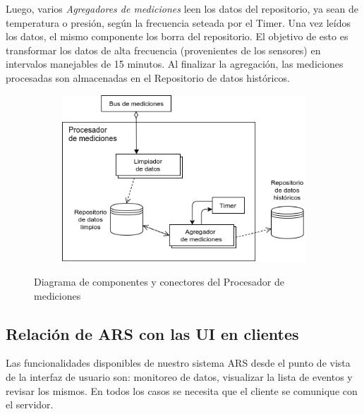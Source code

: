\par Luego, varios \textit{Agregadores de mediciones} leen los datos del repositorio, ya sean de temperatura o presión, según la frecuencia seteada por el Timer. Una vez leídos los datos, el mismo componente los borra del repositorio. El objetivo de esto es transformar los datos de alta frecuencia (provenientes de los sensores) en intervalos manejables de 15 minutos. Al finalizar la agregación, las mediciones procesadas son almacenadas en el Repositorio de datos históricos.

\begin{figure}[H]
  \begin{subfigure}{\textwidth}
    \includegraphics[width=\textwidth]{imagenes/diagramas/procesadorDeMediciones.png}
  \end{subfigure}
  \caption{Diagrama de componentes y conectores del Procesador de mediciones}
  \label{fig:proc_med}
\end{figure}



\subsection{Relación de ARS con las UI en clientes}

\par Las funcionalidades disponibles de nuestro sistema ARS desde el punto de vista de la interfaz de usuario son: monitoreo de datos, visualizar la lista de eventos y revisar los mismos. En todos los casos se necesita que el cliente se comunique con el servidor.

